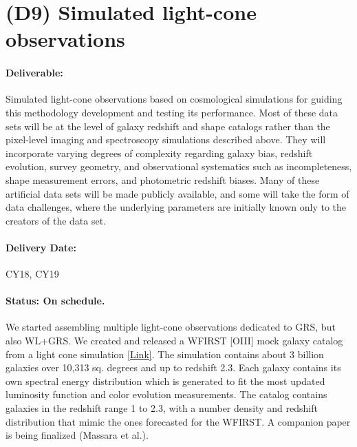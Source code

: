 
\section*{(D9) Simulated light-cone observations}

\paragraph*{Deliverable:} Simulated light-cone observations based on
cosmological simulations for guiding this methodology development and testing
its performance. Most of these data sets will be at the level of galaxy redshift
and shape catalogs rather than the pixel-level imaging and spectroscopy
simulations described above.  They will incorporate varying degrees of
complexity regarding galaxy bias, redshift evolution, survey geometry, and
observational systematics such as incompleteness, shape measurement errors, and
photometric redshift biases.  Many of these artificial data sets will be made
publicly available, and some will take the form of data challenges, where the
underlying parameters are initially known only to the creators of the data set.

\paragraph*{Delivery Date:} CY18, CY19

\paragraph*{Status: On schedule.} We started assembling multiple light-cone
observations dedicated to GRS, but also WL+GRS. We created and released a WFIRST
[OIII] mock galaxy catalog from a light cone simulation
\href{http://www.wfirst-hls-cosmology.org/products/}{[Link]}. The simulation
contains about 3 billion galaxies over 10,313 sq. degrees and up to redshift
2.3. Each galaxy contains its own spectral energy distribution which is
generated to fit the most updated luminosity function and color evolution
measurements. The catalog contains galaxies in the redshift range 1 to 2.3, with
a number density and redshift distribution that mimic the ones forecasted for
the WFIRST. A companion paper is being finalized (Massara et al.).

